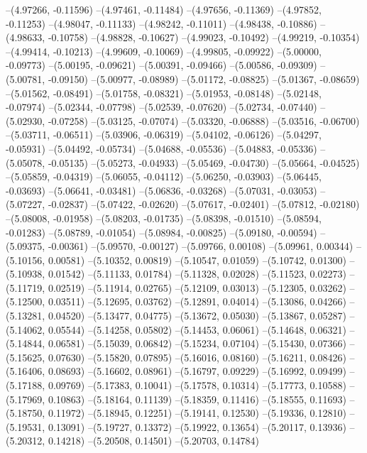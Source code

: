 --(4.97266, -0.11596)
--(4.97461, -0.11484)
--(4.97656, -0.11369)
--(4.97852, -0.11253)
--(4.98047, -0.11133)
--(4.98242, -0.11011)
--(4.98438, -0.10886)
--(4.98633, -0.10758)
--(4.98828, -0.10627)
--(4.99023, -0.10492)
--(4.99219, -0.10354)
--(4.99414, -0.10213)
--(4.99609, -0.10069)
--(4.99805, -0.09922)
--(5.00000, -0.09773)
--(5.00195, -0.09621)
--(5.00391, -0.09466)
--(5.00586, -0.09309)
--(5.00781, -0.09150)
--(5.00977, -0.08989)
--(5.01172, -0.08825)
--(5.01367, -0.08659)
--(5.01562, -0.08491)
--(5.01758, -0.08321)
--(5.01953, -0.08148)
--(5.02148, -0.07974)
--(5.02344, -0.07798)
--(5.02539, -0.07620)
--(5.02734, -0.07440)
--(5.02930, -0.07258)
--(5.03125, -0.07074)
--(5.03320, -0.06888)
--(5.03516, -0.06700)
--(5.03711, -0.06511)
--(5.03906, -0.06319)
--(5.04102, -0.06126)
--(5.04297, -0.05931)
--(5.04492, -0.05734)
--(5.04688, -0.05536)
--(5.04883, -0.05336)
--(5.05078, -0.05135)
--(5.05273, -0.04933)
--(5.05469, -0.04730)
--(5.05664, -0.04525)
--(5.05859, -0.04319)
--(5.06055, -0.04112)
--(5.06250, -0.03903)
--(5.06445, -0.03693)
--(5.06641, -0.03481)
--(5.06836, -0.03268)
--(5.07031, -0.03053)
--(5.07227, -0.02837)
--(5.07422, -0.02620)
--(5.07617, -0.02401)
--(5.07812, -0.02180)
--(5.08008, -0.01958)
--(5.08203, -0.01735)
--(5.08398, -0.01510)
--(5.08594, -0.01283)
--(5.08789, -0.01054)
--(5.08984, -0.00825)
--(5.09180, -0.00594)
--(5.09375, -0.00361)
--(5.09570, -0.00127)
--(5.09766, 0.00108)
--(5.09961, 0.00344)
--(5.10156, 0.00581)
--(5.10352, 0.00819)
--(5.10547, 0.01059)
--(5.10742, 0.01300)
--(5.10938, 0.01542)
--(5.11133, 0.01784)
--(5.11328, 0.02028)
--(5.11523, 0.02273)
--(5.11719, 0.02519)
--(5.11914, 0.02765)
--(5.12109, 0.03013)
--(5.12305, 0.03262)
--(5.12500, 0.03511)
--(5.12695, 0.03762)
--(5.12891, 0.04014)
--(5.13086, 0.04266)
--(5.13281, 0.04520)
--(5.13477, 0.04775)
--(5.13672, 0.05030)
--(5.13867, 0.05287)
--(5.14062, 0.05544)
--(5.14258, 0.05802)
--(5.14453, 0.06061)
--(5.14648, 0.06321)
--(5.14844, 0.06581)
--(5.15039, 0.06842)
--(5.15234, 0.07104)
--(5.15430, 0.07366)
--(5.15625, 0.07630)
--(5.15820, 0.07895)
--(5.16016, 0.08160)
--(5.16211, 0.08426)
--(5.16406, 0.08693)
--(5.16602, 0.08961)
--(5.16797, 0.09229)
--(5.16992, 0.09499)
--(5.17188, 0.09769)
--(5.17383, 0.10041)
--(5.17578, 0.10314)
--(5.17773, 0.10588)
--(5.17969, 0.10863)
--(5.18164, 0.11139)
--(5.18359, 0.11416)
--(5.18555, 0.11693)
--(5.18750, 0.11972)
--(5.18945, 0.12251)
--(5.19141, 0.12530)
--(5.19336, 0.12810)
--(5.19531, 0.13091)
--(5.19727, 0.13372)
--(5.19922, 0.13654)
--(5.20117, 0.13936)
--(5.20312, 0.14218)
--(5.20508, 0.14501)
--(5.20703, 0.14784)
